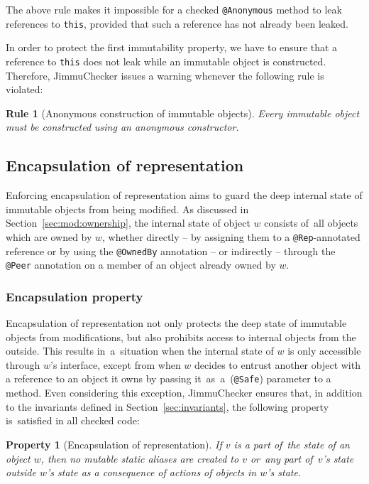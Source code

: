 \documentclass{pracamgr}
\theoremstyle{break}
\theoremstyle{break}
\newtheorem{invariant}{Property}
\theoremstyle{break}
\newtheorem{verrule}{Rule}
\begin{document}
The above rule makes it impossible for a checked \texttt{@Anonymous}
method to leak references to \texttt{this}, provided that such a
reference has not already been leaked.

In order to protect the first immutability property, we have to ensure
that a reference to \texttt{this} does not leak while an immutable
object is constructed. Therefore, JimmuChecker issues a warning
whenever the following rule is violated:
\begin{verrule}[Anonymous construction of immutable objects]
  Every immutable object must be constructed using an anonymous
  constructor.
\end{verrule}


\subsection{Encapsulation of representation}
\label{sec:chk:rep}

Enforcing encapsulation of representation aims to guard the deep
internal state of immutable objects from being modified. As discussed
in Section~\ref{sec:mod:ownership}, the internal state of object $w$
consists of~all objects which are owned by $w$, whether directly -- by
assigning them to a \texttt{@Rep}-annotated reference or by using the
\texttt{@OwnedBy} annotation -- or indirectly -- through the
\texttt{@Peer} annotation on a member of an object already owned by
$w$.

\subsubsection{Encapsulation property} 

Encapsulation of representation not only protects the deep state of
immutable objects from modifications, but also prohibits access to
internal objects from the outside. This results in~a~situation when
the internal state of $w$ is only accessible through $w$'s interface,
except from when $w$ decides to entrust another object with a
reference to an object it owns by passing it~as~a~(\texttt{@Safe})
parameter to a method. Even considering this exception, JimmuChecker
ensures that, in addition to the invariants defined in
Section~\ref{sec:invariants}, the following property is~satisfied in
all checked code:

\begin{invariant}[Encapsulation of representation] \label{inv:encap}
  If $v$ is a part of~the state of an object $w$, then no mutable
  static aliases are created to $v$ or~any part of~$v$'s state outside
  $w$'s state as a consequence of actions of objects in $w$'s state.
\end{invariant}
\end{document}
